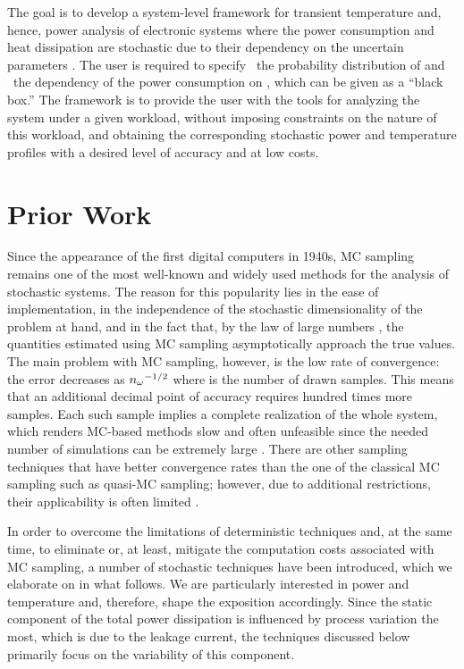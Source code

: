 The goal is to develop a system-level framework for transient temperature and,
hence, power analysis of electronic systems where the power consumption and heat
dissipation are stochastic due to their dependency on the uncertain parameters
\vu. The user is required to specify \one~the probability distribution of \vu
and \two~the dependency of the power consumption on \vu, which can be given as a
``black box.'' The framework is to provide the user with the tools for analyzing
the system under a given workload, without imposing constraints on the nature of
this workload, and obtaining the corresponding stochastic power \mp and
temperature \mq profiles with a desired level of accuracy and at low costs.

\section{Prior Work}

Since the appearance of the first digital computers in 1940s, \acf{MC} sampling
remains one of the most well-known and widely used methods for the analysis of
stochastic systems. The reason for this popularity lies in the ease of
implementation, in the independence of the stochastic dimensionality of the
problem at hand, and in the fact that, by the law of large numbers
\cite{durrett2010}, the quantities estimated using \ac{MC} sampling
asymptotically approach the true values. The main problem with \ac{MC} sampling,
however, is the low rate of convergence: the error decreases as ${n_{\omega}}^{-1/2}$
where \no is the number of drawn samples. This means that an additional decimal
point of accuracy requires hundred times more samples. Each such sample implies
a complete realization of the whole system, which renders \ac{MC}-based methods
slow and often unfeasible since the needed number of simulations can be
extremely large \cite{diaz-emparanza2002}. There are other sampling techniques
that have better convergence rates than the one of the classical \ac{MC}
sampling such as quasi-\ac{MC} sampling; however, due to additional
restrictions, their applicability is often limited \cite{xiu2010}.

In order to overcome the limitations of deterministic techniques and, at the
same time, to eliminate or, at least, mitigate the computation costs associated
with \ac{MC} sampling, a number of stochastic techniques have been introduced,
which we elaborate on in what follows. We are particularly interested in power
and temperature and, therefore, shape the exposition accordingly. Since the
static component of the total power dissipation is influenced by process
variation the most, which is due to the leakage current, the techniques
discussed below primarily focus on the variability of this component.

